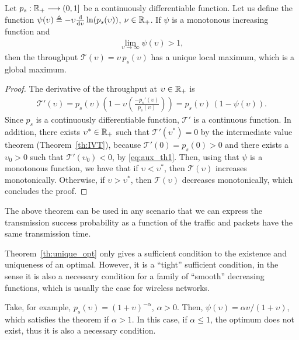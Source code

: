 \begin{theorem}\label{th:unique_opt}
    Let $p_s:{\mathbb R}_+\longrightarrow (0,1]$ be a continuously differentiable function. Let us define the function $\psi(\upsilon) \triangleq -\upsilon \frac{\mathrm{d}}{\mathrm{d}\upsilon} \ln (p_s(\upsilon))$, $\nu\in{\mathbb R}_+$.
    If $\psi$ is a monotonous increasing function and \vspace{-6mm}
    \begin{align} \label{eq:aux_th1}
        \lim_{\upsilon\to\infty} \psi(\upsilon) > 1,
    \end{align}
    then the throughput $\mathscr{T}(\upsilon) = \upsilon\,p_s(\upsilon)$ has a unique local maximum, which is a global maximum.
\end{theorem}
%
\begin{proof}
    The derivative of the throughput at $\upsilon\in{\mathbb R}_+$ is
\begin{align*}
    \mathscr{T}'(\upsilon)
        = p_s(\upsilon) \left(1 - \upsilon \left(\frac{-p_s'(\upsilon)}{p_s(\upsilon)}
            \right)\right) 
        = p_s(\upsilon) \, (1-\psi(\upsilon)).
    \end{align*}
    Since $p_s$ is a continuously differentiable function, $\mathscr{T}'$ is a continuous function. In addition, there exists $\upsilon^*\in{\mathbb R}_+$ such that $\mathscr{T}'(\upsilon^*) = 0$ by the intermediate value theorem (Theorem~\ref{th:IVT}), because $\mathscr{T}'(0) = p_s(0) > 0$ and there exists a $\upsilon_0 > 0$ such that $\mathscr{T}'(\upsilon_0) < 0$, by \eqref{eq:aux_th1}.
    Then, using that $\psi$ is a monotonous function, we have that if $\upsilon < \upsilon^*$, then $\mathscr{T}(\upsilon)$ increases monotonically. Otherwise, if $\upsilon > \upsilon^*$, then $\mathscr{T}(\upsilon)$ decreases monotonically, which concludes the proof.
\end{proof}

The above theorem can be used in any scenario that we can express the transmission success probability as a function of the traffic and packets have the same transmission time.

\begin{remark}
    Theorem~\ref{th:unique_opt} only gives a sufficient condition to the existence and uniqueness of an optimal. However, it is a ``tight'' sufficient condition, in the sense it is also a necessary condition for a family of ``smooth'' decreasing functions, which is usually the case for wireless networks.
    
    Take, for example, $p_s(\upsilon) = (1+\upsilon)^{-\alpha}$, $\alpha>0$. Then, $\psi(\upsilon) = \alpha\upsilon/(1+\upsilon)$, which satisfies the theorem if $\alpha>1$. In this case, if $\alpha\le 1$, the optimum does not exist, thus it is also a necessary condition.
\end{remark}

